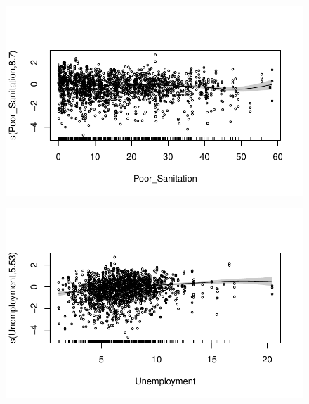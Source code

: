 \documentclass[
  letterpaper,
  DIV=11,
  numbers=noendperiod]{scrartcl}
\begin{document}
\begin{figure}[H]

{\centering \includegraphics{Group34Coursework_files/figure-pdf/unnamed-chunk-17-6.pdf}

}

\end{figure}

\begin{figure}[H]

{\centering \includegraphics{Group34Coursework_files/figure-pdf/unnamed-chunk-17-7.pdf}

}

\end{figure}
\end{document}
